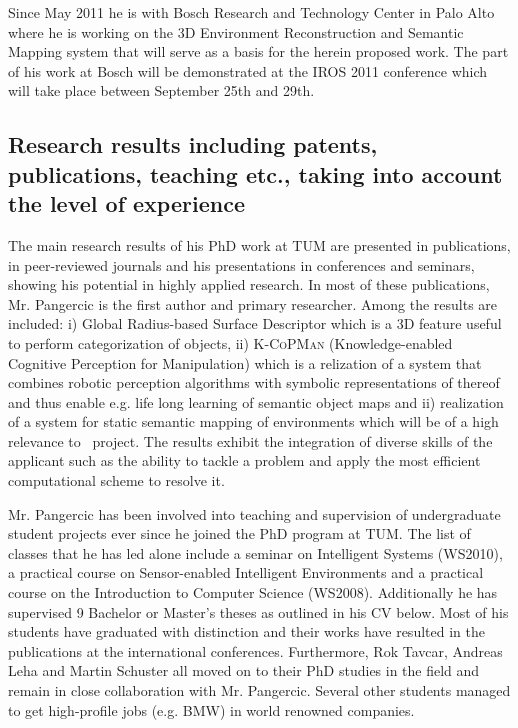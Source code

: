 Since May 2011 he is with Bosch Research and Technology Center in Palo Alto where he is working 
on the 3D Environment Reconstruction and Semantic Mapping system that will serve as a basis for
the herein proposed work. The part of his work at Bosch will be demonstrated at the IROS 2011
conference which will take place between September 25th and 29th. \\ 
\subsection{Research results including patents, publications, teaching etc., taking into account the level 
of experience} 
The main research results of his PhD work at TUM are presented in publications, in
peer-reviewed journals and his presentations in conferences and seminars, showing his 
potential in highly applied research. In most of these publications, Mr. Pangercic is the  first 
author and primary researcher. Among the results are included: i) Global Radius-based Surface
Descriptor which is a 3D feature useful to perform categorization of objects, ii) \textsc{K-CoPMan}
(Knowledge-enabled Cognitive Perception for Manipulation) which is a relization of a system that 
combines robotic perception algorithms with symbolic representations of thereof and thus enable
e.g. life long learning of semantic object maps and ii) realization of
a system for static semantic mapping of environments which will be of a high relevance to \ksem\ project.
The results exhibit the integration of diverse skills of the applicant such as the ability  to tackle 
a problem and apply the most efficient computational scheme to resolve it.

Mr. Pangercic has been involved into teaching and supervision of undergraduate 
student projects ever since he joined the PhD program at TUM. The list of classes 
that he has led alone include a seminar on Intelligent Systems (WS2010), a practical 
course on Sensor-enabled Intelligent Environments and a practical course on the 
Introduction to Computer Science (WS2008). Additionally he has supervised 9 Bachelor
or Master's theses as outlined in his CV below. Most of his students have graduated
with distinction and their works have resulted in the publications at the international
conferences. Furthermore, Rok Tavcar, Andreas Leha and Martin Schuster all moved on 
to their PhD studies in the field and remain in close collaboration with Mr. Pangercic.
Several other students managed to get high-profile jobs (e.g. BMW) in world renowned 
companies. 

